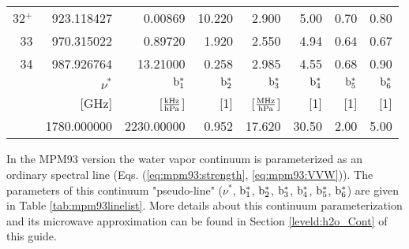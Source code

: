 {\begin{longtable}{rrrrrrrr}
32$^+$ & 923.118427 & 0.00869 & 10.220& 2.900 & 5.00 & 0.70 & 0.80 \\
33     & 970.315022 & 0.89720 & 1.920 & 2.550 & 4.94 & 0.64 & 0.67 \\
34     & 987.926764 & 13.21000& 0.258 & 2.985 & 4.55 & 0.68 & 0.90 \\
\hline
 & $\nu^*$ & $\rm b^*_{\rm 1}$ & $\rm b^*_{\rm 2}$ & $\rm b^*_{\rm 3}$ & $\rm b^*_{\rm 4}$ & $\rm b^*_{\rm 5}$ & $\rm b^*_{\rm 6}$\\
 & {\rm [GHz]}  & {[$\frac{\rm kHz}{\rm hPa}$]} & {\rm [1]} & 
 {[$\frac{\rm MHz}{\rm hPa}$]} & {\rm [1]} & {\rm [1]} & {\rm [1]} \\
\hline
 & 1780.000000 & 2230.00000 & 0.952 & 17.620 & 30.50 & 2.00 & 5.00 \\
\end{longtable}



\label{levele:mpm93:h2ocont}
In the MPM93 version the water vapor continuum is parameterized as an
ordinary spectral line (Eqs. (\ref{eq:mpm93:strength}, 
\ref{eq:mpm93:VVW})). The parameters of this continuum "pseudo-line" 
($\nu^*$, $\rm b^*_{\rm 1}$, $\rm b^*_{\rm 2}$, $\rm b^*_{\rm 3}$, $\rm b^*_{\rm 4}$, $\rm b^*_{\rm 5}$, $\rm b^*_{\rm 6}$) 
are given in Table \ref{tab:mpm93linelist}. More details about 
this continuum parameterization and its microwave approximation can be 
found in Section \ref{leveld:h2o_Cont} of this guide.




\label{leveld:cp98}

}
